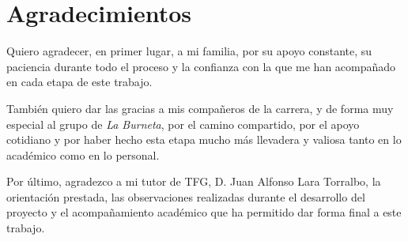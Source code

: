 \chapter*{Agradecimientos}
{}

Quiero agradecer, en primer lugar, a mi familia, por su apoyo constante, su
paciencia durante todo el proceso y la confianza con la que me han acompañado
en cada etapa de este trabajo.

También quiero dar las gracias a mis compañeros de la carrera, y de forma muy
especial al grupo de \textit{La Burneta}, por el camino compartido, por el
apoyo cotidiano y por haber hecho esta etapa mucho más llevadera y valiosa
tanto en lo académico como en lo personal.

Por último, agradezco a mi tutor de TFG, D. Juan Alfonso Lara Torralbo, la
orientación prestada, las observaciones realizadas durante el desarrollo del
proyecto y el acompañamiento académico que ha permitido dar forma final a este
trabajo.
